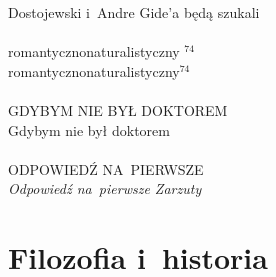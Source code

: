 \documentclass[a4paper,11pt]{article}
\begin{document}
\Pow  Dostojewski i~Andre Gide'a będą szukali \\
 \\
\Jest romantyczno\dywiz naturalistyczny $^{ 74 }$ \\
\Pow  romantyczno\dywiz naturalistyczny$^{ 74 }$ \\
 \\
\Jest G{\footnotesize DYBYM NIE BYŁ DOKTOREM} \\
\Pow  Gdybym nie był doktorem \\
 \\
\Jest ODPOWIEDŹ NA~PIERWSZE \\
\Pow  \emph{Odpowiedź na~pierwsze Zarzuty} \\

\vspace{\spaceTwo}





\newpage
\section{Filozofia i~historia}

\vspace{\spaceTwo}














\end{document}
